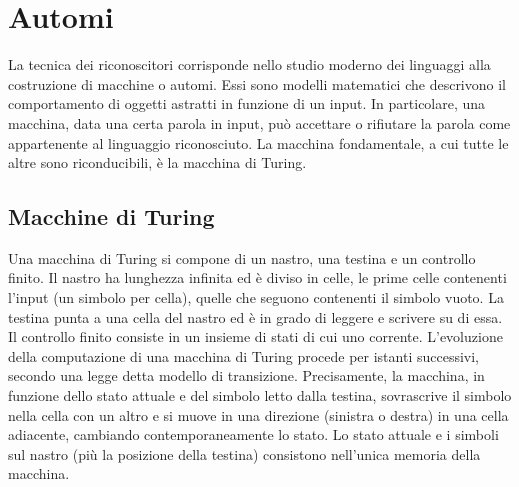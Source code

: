 \section{Automi}
La tecnica dei riconoscitori corrisponde nello studio moderno dei linguaggi alla costruzione di macchine o automi. Essi sono modelli matematici che descrivono il comportamento di oggetti astratti in funzione di un input. In particolare, una macchina, data una certa parola in input, può accettare o rifiutare la parola come appartenente al linguaggio riconosciuto. La macchina fondamentale, a cui tutte le altre sono riconducibili, è la macchina di Turing.


\subsection{Macchine di Turing}
Una macchina di Turing si compone di un nastro, una testina e un controllo finito. Il nastro ha lunghezza infinita ed è diviso in celle, le prime celle contenenti l'input (un simbolo per cella), quelle che seguono contenenti il simbolo vuoto. La testina punta a una cella del nastro ed è in grado di leggere e scrivere su di essa. Il controllo finito consiste in un insieme di stati di cui uno corrente. L'evoluzione della computazione di una macchina di Turing procede per istanti successivi, secondo una legge detta modello di transizione. Precisamente, la macchina, in funzione dello stato attuale e del simbolo letto dalla testina, sovrascrive il simbolo nella cella con un altro e si muove in una direzione (sinistra o destra) in una cella adiacente, cambiando contemporaneamente lo stato. Lo stato attuale e i simboli sul nastro (più la posizione della testina) consistono nell'unica memoria della macchina.

